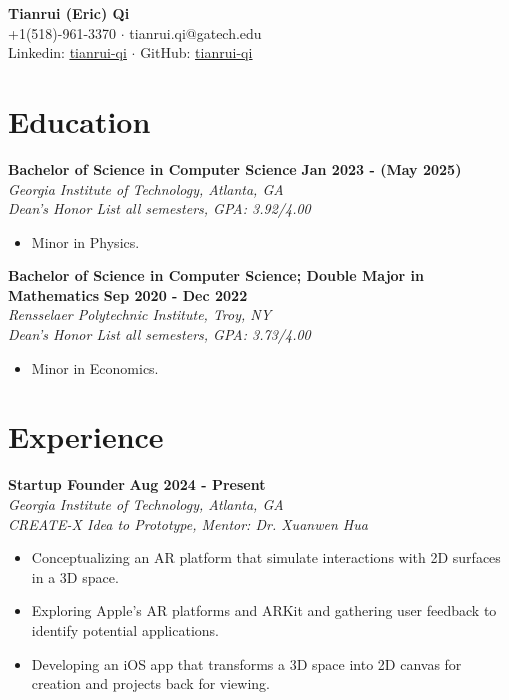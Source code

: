 \documentclass[letterpaper, 11pt]{article}
\newcommand{\subsectionvspace}{\vspace{6pt}}
\begin{document}
\begin{center}
    \textbf{\LARGE Tianrui (Eric) Qi} \\
    +1(518)-961-3370 
    $\cdot$ 
    tianrui.qi@gatech.edu
    \\
    Linkedin: \href{https://www.linkedin.com/in/tianrui-qi/}{\underline{tianrui-qi}}
    $\cdot$
    GitHub: \href{https://github.com/tianrui-qi}{\underline{tianrui-qi}}
\end{center}


\section{Education}


    \textbf{Bachelor of Science in Computer Science} \hfill 
    \textbf{Jan 2023 - (May 2025)} \\
    \textit{Georgia Institute of Technology, Atlanta, GA} \\ 
    \textit{Dean's Honor List all semesters, GPA: 3.92/4.00}
    \begin{itemize}
        \item Minor in Physics.
    \end{itemize}

    \subsectionvspace

    \textbf{Bachelor of Science in Computer Science; Double Major in Mathematics} \hfill 
    \textbf{Sep 2020 - Dec 2022} \\
    \textit{Rensselaer Polytechnic Institute, Troy, NY} \\ 
    \textit{Dean's Honor List all semesters, GPA: 3.73/4.00}
    \begin{itemize}
        \item Minor in Economics.
    \end{itemize}


\section{Experience}


    \textbf{Startup Founder} \hfill 
    \textbf{Aug 2024 - Present} \\
    \textit{Georgia Institute of Technology, Atlanta, GA} \\
    \textit{CREATE-X Idea to Prototype, Mentor: Dr. Xuanwen Hua}
    \begin{itemize}
        \item Conceptualizing an AR platform that simulate interactions with 2D surfaces in a 3D space.
        \item Exploring Apple's AR platforms and ARKit and gathering user feedback to identify potential applications. 
        \item Developing an iOS app that transforms a 3D space into 2D canvas for creation and projects back for viewing.
    \end{itemize}
\end{document}
